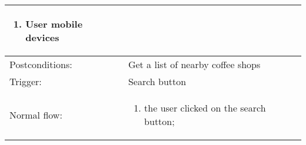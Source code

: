\begin{longtable}{| p{3.5cm} | p{9cm} |}
\begin{enumerate}
\item User mobile devices 
\end{enumerate}\\
\hline
Postconditions: & Get a list of nearby coffee shops\\
\hline
Trigger: &  Search button\\
\hline
Normal flow: &\mbox{}\par\vspace{-\baselineskip}
\begin{enumerate}
\item the user clicked on the search button;
\end{enumerate}\\
\hline
\end{longtable}

